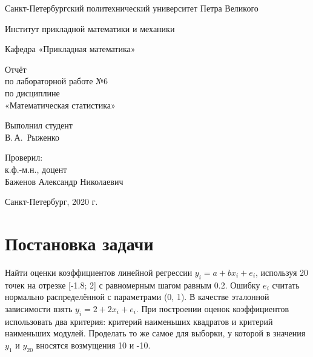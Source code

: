 \documentclass[12pt,a4paper]{scrartcl}
\begin{document}
\begin{titlepage}
  \begin{center}

    Санкт-Петербургский политехнический университет Петра Великого

    \vspace{0.25cm}
    
    Институт прикладной математики и механики
    
    Кафедра «Прикладная математика»
    \vfill

	\vspace{0.25cm}
	    Отчёт\\
	по лабораторной работе №6\\
	по дисциплине\\
	«Математическая статистика»

  \bigskip

\end{center}
\vfill

\newlength{\ML}
\hfill\begin{minipage}{0.4\textwidth}
  Выполнил студент\\ В.\,А.~Рыженко\\
\end{minipage}%
\bigskip

\hfill\begin{minipage}{0.4\textwidth}
  Проверил:\\
к.ф.-м.н., доцент\\
Баженов Александр Николаевич\\
\end{minipage}%
\vfill

\begin{center}
  Санкт-Петербург, 2020 г.
\end{center}
\end{titlepage}

\tableofcontents
\listoffigures
\newpage

\section{Постановка задачи}
 
Найти оценки коэффициентов линейной регрессии $y_{i} = a + bx_{i} + e_{i}$, используя 20 точек на отрезке [-1.8; 2] с равномерным шагом равным 0.2. Ошибку $e_{i}$ считать нормально распределённой с параметрами (0, 1). В качестве эталонной зависимости взять $y_{i} = 2 + 2x_{i} + e_{i}$. При построении оценок коэффициентов использовать два критерия: критерий наименьших квадратов и критерий наименьших модулей. Проделать то же самое для выборки, у которой в значения $y_{1}$ и $y_{20}$ вносятся возмущения 10 и -10.
\end{document}
